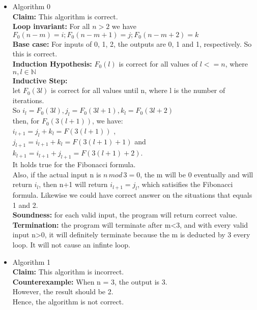 \documentclass[12pt]{article}
\begin{document}
\begin{itemize}
    \item Algorithm 0\\
        \textbf{Claim:} This algorithm is correct.\\
        \textbf{Loop invariant:} For all $n>2$ we have $F_0(n-m)=i; F_0(n-m+1)=j;F_0(n-m+2) = k$\\

        \textbf{Base case:} For inputs of 0, 1, 2, the outputs are 0, 1 and 1, respectively. So this is correct. \\
        \textbf{Induction Hypothesis:} $F_0(l)$ is correct for all values of $l<=n$, where $n,l\in \mathbb{N}$ \\
        \textbf{Inductive Step:} \\
            let $F_0(3l)$ is correct for all values until n, where l is the number of iterations. \\
            So $i_l=F_0(3l), j_l=F_0(3l+1), k_l=F_0(3l+2)$ \\
            then, for $F_0(3(l+1))$, we have:\\
            $i_{l+1}=j_l+k_l=F(3(l+1))$ ,\\
            $j_{l+1}=i_{l+1}+k_l=F(3(l+1)+1)$  and \\
            $k_{l+1}=i_{l+1}+j_{l+1}=F(3(l+1)+2)$. \\
            It holds true for the Fibonacci formula. \\
            Also, if the actual input n is $n\,mod\,3=0$, the m will be 0 eventually and will return $i_{l}$, then n+1 will return $i_{l+1}=j_l$, which satisifies the Fibonacci formula. Likewise we could have correct answer on the situations that equals 1 and 2. \\
            \textbf{Soundness: } for each valid input, the program will return correct value.\\
            \textbf{Termination: } the program will terminate after m<3, and with every valid input n>0, it will definitely terminate because the m is deducted by 3 every loop. It will not cause an infinte loop.


            
    \item Algorithm 1\\
        \textbf{Claim:} This algorithm is incorrect.\\
        \textbf{Counterexample:} When n = 3, the output is 3.\\
        However, the result should be 2.\\
        Hence, the algorithm is not correct.


\end{itemize}
\end{document}
